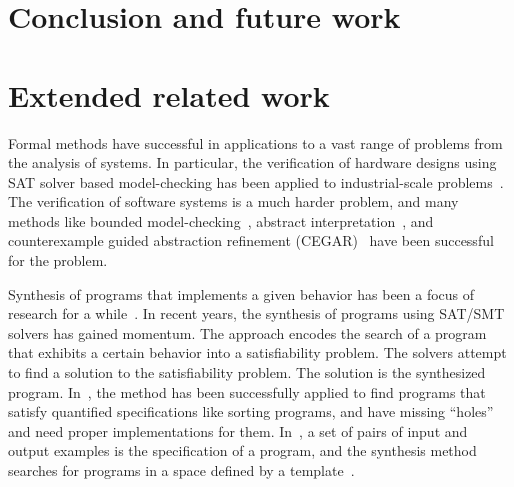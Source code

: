 \documentclass{llncs}
\begin{document}
% 

\section{Conclusion and future work}
\label{sec:conclusion}





\appendix

\section{Extended related work}


Formal methods have successful in applications to a vast range of
problems from the analysis of systems.
%
In particular,
the verification of hardware designs
using SAT solver based model-checking has been applied
to industrial-scale problems~\cite{biere1999symbolic2}.
%
The verification of software systems is a much harder problem, and
many methods like bounded model-checking~\cite{biere2003bounded},
abstract interpretation~\cite{lattice77}, and
counterexample guided abstraction refinement (CEGAR)~\cite{ClarkeCEGAR} have
been successful for the problem.
%

Synthesis of programs that implements a given behavior
has been a focus of research for a while~\cite{PnueliSynthesis}.
%
In recent years, the synthesis of programs using SAT/SMT solvers
has gained momentum.
%
The approach encodes the search of a program that exhibits a certain
behavior into a satisfiability problem.
%
The solvers attempt to find a solution to the satisfiability problem.
%
The solution is the synthesized program.
%
In~\cite{SrivastavaSynthesis,Solar-Lezama2005},
the method has been successfully applied
to find programs that satisfy quantified specifications like sorting
programs, and have missing ``holes'' and need proper implementations
for them.
%
In~\cite{exampleSynth},
a set of pairs of input and output examples is the specification of a program,
and the synthesis method searches for programs in a space defined by a
template~\cite{sygus}.
\end{document}
